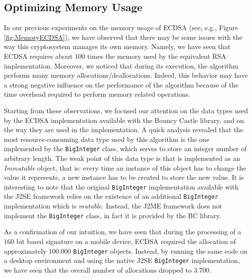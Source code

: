 \documentclass[authoryear]{elsarticle}
\begin{document}

\subsection{Optimizing Memory Usage}
\label{subsec:optmem}

In our previous experiments on the memory usage of ECDSA (see, e.g., Figure \ref{fig:MemoryECDSA}), we have observed that there may be some issues with the way this cryptosystem manages its own memory. Namely, we have seen that ECDSA requires about $100$ times the memory used by the equivalent RSA implementation. Moreover, we noticed that during its execution, the algorithm performs many memory allocations/deallocations. Indeed, this behavior may have a strong negative influence on the performance of the algorithm because of the time overhead required to perform memory related operations.

Starting from these observations, we focused our attention on the data types used by the ECDSA implementation available with the Bouncy Castle library, and on the way they are used in the implementation.  A quick analysis revealed that the most resource-consuming data type used by this algorithm is the one implemented by the {\tt BigInteger} class, which serves to store an integer number of arbitrary length. The weak point of this data type is that is implemented as an {\em Immutable} object, that is: every time an instance of this object has to change the value it represents, a new instance has to be created to store the new value.  It is interesting to note that the original {\tt BigInteger} implementation available with the J2SE framework relies on the existence of an additional {\tt BigInteger} implementation which is {\em mutable}. Instead, the J2ME framework does not implement the {\tt BigInteger} class, in fact it is provided by the BC library.

As a confirmation of our intuition, we have seen that during the processing of a $160$ bit based signature on a mobile device, ECDSA required the allocation of approximately $100.000$ {\tt BigInteger} objects. Instead, by running the same code on a desktop environment and using the native J2SE {\tt BigInteger} implementation, we have seen that the overall number of allocations dropped to $3.700$.
\end{document}

